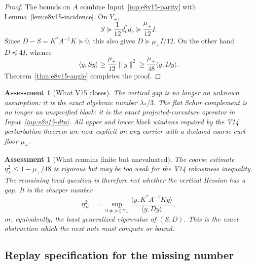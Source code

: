 \documentclass[11pt,oneside]{book}
\newtheorem{assessment}[theorem]{Assessment}
\theoremstyle{definition}
\theoremstyle{remark}
\begin{document}
\begin{proof}
The bounds on \(A\) combine Input~\ref{inp:e8v15-parity} with
Lemma~\ref{lem:e8v15-incidence}.  On \(Y_+\),
\[
 S\succeq\frac1{12}d_c^*d_c
   \succeq\frac{\mu_+}{12}I.
\]
Since \(D-S=K^*A^{-1}K\succeq0\), this also gives
\(D\succeq\mu_+I/12\).  On the other hand \(D\preceq4I\), whence
\[
 \langle y,Sy\rangle
\geq\frac{\mu_+}{12}\|y\|^2
\geq\frac{\mu_+}{48}\langle y,Dy\rangle .
\]
Theorem~\ref{thm:e8v15-angle} completes the proof.
\end{proof}

\begin{assessment}[What V15 closes]
\label{ass:e8v15-closes}
The vertical gap is no longer an unknown assumption: it is the exact
algebraic number \(\lambda_*/3\).  The flat Schur complement is no
longer an unspecified block: it is the exact projected-curvature
operator in Input~\ref{inp:e8v15-dtn}.  All upper and lower block
windows required by the V14 perturbation theorem are now explicit on
any carrier with a declared coarse curl floor \(\mu_+\).
\end{assessment}

\begin{assessment}[What remains finite but unevaluated]
\label{ass:e8v15-remains}
The coarse estimate
\(\eta_F^2\leq1-\mu_+/48\) is rigorous but may be too weak for the V14
robustness inequality.  The remaining local question is therefore not
whether the vertical Hessian has a gap.  It is the sharper number
\[
 \eta_{F,+}^2
 =\sup_{0\ne y\in Y_+}
    \frac{\langle y,K^*A^{-1}Ky\rangle}
         {\langle y,Dy\rangle},
\]
or, equivalently, the least generalized eigenvalue of \((S,D)\).
This is the exact obstruction which the next note must compute or
bound.
\end{assessment}

\subsection{Replay specification for the missing number}
\end{document}
